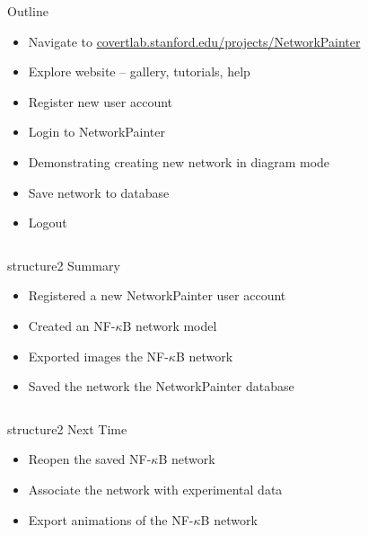 \documentclass[mathserif]{beamer}
\begin{document}
\begin{frame}{Outline}
\begin{itemize}
\item Navigate to \url{covertlab.stanford.edu/projects/NetworkPainter}
\item Explore website -- gallery, tutorials, help
\item Register new user account
\item Login to NetworkPainter
\item Demonstrating creating new network in diagram mode
\item Save network to database
\item Logout
\end{itemize}
\end{frame}

\begin{frame}
\begin{columns}
\begin{column}{3.5in}
\begin{center}
\begin{beamercolorbox}[rounded=true,shadow=true,center,sep=0.01cm]{structure2}
\LARGE
Summary
\end{beamercolorbox}
\begin{itemize}
\item Registered a new NetworkPainter user account
\item Created an NF-$\kappa$B network model
\item Exported images the NF-$\kappa$B network
\item Saved the network the NetworkPainter database
\end{itemize}
\end{center}
\end{column}
\end{columns}
\end{frame}

\begin{frame}
\begin{columns}
\begin{column}{3.5in}
\begin{center}
\begin{beamercolorbox}[rounded=true,shadow=true,center,sep=0.01cm]{structure2}
\LARGE
Next Time
\end{beamercolorbox}
\begin{itemize}
\item Reopen the saved NF-$\kappa$B network
\item Associate the network with experimental data
\item Export animations of the NF-$\kappa$B network
\end{itemize}
\end{center}
\end{column}
\end{columns}
\end{frame}
\end{document}
